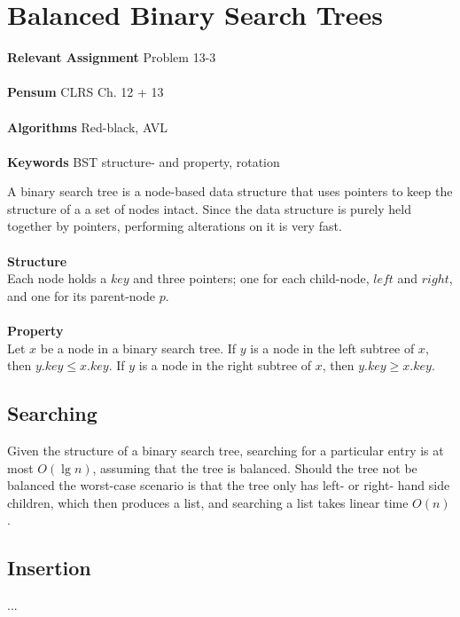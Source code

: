
\chapter{Balanced Binary Search Trees}
\label{ch:balancedbinarysearchtrees}

\textbf{Relevant Assignment} Problem 13-3\\\\
\textbf{Pensum} CLRS Ch. 12 + 13\\\\
\textbf{Algorithms} Red-black, AVL\\\\
\textbf{Keywords} BST structure- and property, rotation
\vspace{1in}

\noindent A binary search tree is a node-based data structure that uses
pointers to keep the structure of a a set of nodes intact. Since the data
structure is purely held together by pointers, performing alterations on it
is very fast.
\\\\
\noindent \textbf{Structure} \\
Each node holds a $key$ and three pointers; one for each child-node, $left$
and $right$, and one for its parent-node $p$.
\\\\
\noindent \textbf{Property} \\
Let $x$ be a node in a binary search tree. If $y$ is a node in the left
subtree of $x$, then $y.key \leq x.key$. If $y$ is a node in the right
subtree of $x$, then $y.key \geq x.key$.

\newpage
\section{Searching}
Given the structure of a binary search tree, searching for a particular entry
is at most $O(\lg n)$, assuming that the tree is balanced. Should the tree not
be balanced the worst-case scenario is that the tree only has left- or right-
hand side children, which then produces a list, and searching a list takes
linear time $O(n)$.
 
\section{Insertion}
...


